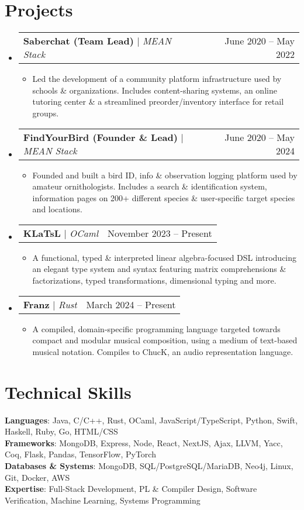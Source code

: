 \documentclass[letterpaper,11pt]{article}
\makeatletter
\newcommand{\resumeItem}[1]{
  \item\small{
    {#1 \vspace{-2pt}}
  }
}
\newcommand{\resumeProjectHeading}[2]{
    \item
    \begin{tabular*}{0.97\textwidth}{l@{\extracolsep{\fill}}r}
      \small#1 & #2 \\
    \end{tabular*}\vspace{-7pt}
}
\newcommand{\resumeSubHeadingListStart}{\begin{itemize}[leftmargin=0.15in, label={}]}
\newcommand{\resumeSubHeadingListEnd}{\end{itemize}}
\newcommand{\resumeItemListStart}{\begin{itemize}}
\newcommand{\resumeItemListEnd}{\end{itemize}\vspace{-5pt}}
\makeatother
\begin{document}
\section{Projects}
    \resumeSubHeadingListStart
      \resumeProjectHeading
          {\textbf{Saberchat (Team Lead)} $|$ \emph{MEAN Stack}}{June 2020 -- May 2022}
          \resumeItemListStart
            \resumeItem{Led the development of a community platform infrastructure used by schools \& organizations. Includes content-sharing systems, an online tutoring center \& a streamlined preorder/inventory interface for retail groups.\\[-1pt]}
          \resumeItemListEnd
      \resumeProjectHeading
          {\textbf{FindYourBird (Founder \& Lead)} $|$ \emph{MEAN Stack}}{June 2020 -- May 2024}
          \resumeItemListStart
            \resumeItem{Founded and built a bird ID, info \& observation logging platform used by amateur ornithologists. Includes a search \& identification system, information pages on 200+ different species \& user-specific target species and locations.\\[-2pt]}
          \resumeItemListEnd
      \resumeProjectHeading
          {\textbf{KLaTsL} $|$ \emph{OCaml}}{November 2023 -- Present}
          \resumeItemListStart
            \resumeItem{A functional, typed \& interpreted  linear algebra-focused DSL introducing an elegant type system and syntax featuring matrix comprehensions \& factorizations, typed transformations, dimensional typing and more.\\[-1pt]}
          \resumeItemListEnd
      \resumeProjectHeading
          {\textbf{Franz} $|$ \emph{Rust}}{March 2024 -- Present}
          \resumeItemListStart
            \resumeItem{A compiled, domain-specific programming language targeted towards compact and modular musical composition, using a medium of text-based musical notation. Compiles to ChucK, an audio representation language.\\[-2pt]}
          \resumeItemListEnd
    \resumeSubHeadingListEnd
%
\section{Technical Skills}
 \begin{itemize}[leftmargin=0.15in, label={}]
    \small{\item{
     \textbf{Languages}{: Java, C/C++, Rust,  OCaml, JavaScript/TypeScript, Python, Swift, Haskell, Ruby, Go, HTML/CSS} \\
     \textbf{Frameworks}{: MongoDB, Express, Node, React, NextJS, Ajax, LLVM, Yacc, Coq, Flask, Pandas, TensorFlow, PyTorch} \\
     \textbf{Databases \& Systems}{: MongoDB, SQL/PostgreSQL/MariaDB, Neo4j, Linux, Git, Docker, AWS}\\
     \textbf{Expertise}{: Full-Stack Development, PL \& Compiler Design, Software Verification, Machine Learning, Systems Programming} \\
    }}
 \end{itemize}


\end{document}
